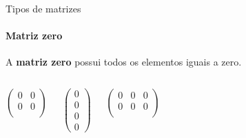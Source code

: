 \begin{frame}[t]{Tipos de matrizes} 
    \framesubtitle{Matriz zero}
 
    A \textbf{matriz zero} possui todos os elementos iguais a zero.
    \vspace*{0.8cm}

    \begin{columns}[c]
        \begin{equation}
            \begin{pmatrix}
                0 & 0 \\
                0 & 0 \\
            \end{pmatrix}
        \end{equation}
    
       \begin{equation}
        \begin{pmatrix}
            0 \\
            0 \\
            0 \\
            0
            \end{pmatrix}
        \end{equation}

        \begin{equation}
         \begin{pmatrix}
             0 & 0  & 0\\
             0 & 0  & 0\\

             \end{pmatrix}
         \end{equation}

   \end{columns}
    
\end{frame}

